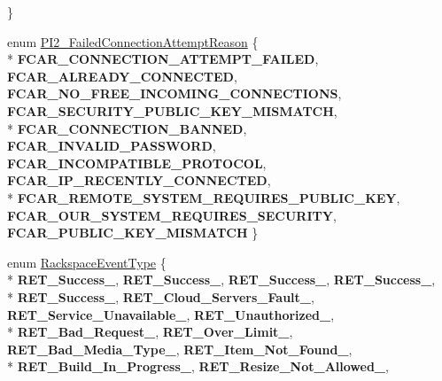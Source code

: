 \begin{DoxyCompactItemize}
 \}
\item 
enum \hyperlink{group___p_l_u_g_i_n___i_n_t_e_r_f_a_c_e___g_r_o_u_p_ga3e92f686bace869b78c10508c58e0825}{P\-I2\-\_\-\-Failed\-Connection\-Attempt\-Reason} \{ \\*
{\bfseries F\-C\-A\-R\-\_\-\-C\-O\-N\-N\-E\-C\-T\-I\-O\-N\-\_\-\-A\-T\-T\-E\-M\-P\-T\-\_\-\-F\-A\-I\-L\-E\-D}, 
{\bfseries F\-C\-A\-R\-\_\-\-A\-L\-R\-E\-A\-D\-Y\-\_\-\-C\-O\-N\-N\-E\-C\-T\-E\-D}, 
{\bfseries F\-C\-A\-R\-\_\-\-N\-O\-\_\-\-F\-R\-E\-E\-\_\-\-I\-N\-C\-O\-M\-I\-N\-G\-\_\-\-C\-O\-N\-N\-E\-C\-T\-I\-O\-N\-S}, 
{\bfseries F\-C\-A\-R\-\_\-\-S\-E\-C\-U\-R\-I\-T\-Y\-\_\-\-P\-U\-B\-L\-I\-C\-\_\-\-K\-E\-Y\-\_\-\-M\-I\-S\-M\-A\-T\-C\-H}, 
\\*
{\bfseries F\-C\-A\-R\-\_\-\-C\-O\-N\-N\-E\-C\-T\-I\-O\-N\-\_\-\-B\-A\-N\-N\-E\-D}, 
{\bfseries F\-C\-A\-R\-\_\-\-I\-N\-V\-A\-L\-I\-D\-\_\-\-P\-A\-S\-S\-W\-O\-R\-D}, 
{\bfseries F\-C\-A\-R\-\_\-\-I\-N\-C\-O\-M\-P\-A\-T\-I\-B\-L\-E\-\_\-\-P\-R\-O\-T\-O\-C\-O\-L}, 
{\bfseries F\-C\-A\-R\-\_\-\-I\-P\-\_\-\-R\-E\-C\-E\-N\-T\-L\-Y\-\_\-\-C\-O\-N\-N\-E\-C\-T\-E\-D}, 
\\*
{\bfseries F\-C\-A\-R\-\_\-\-R\-E\-M\-O\-T\-E\-\_\-\-S\-Y\-S\-T\-E\-M\-\_\-\-R\-E\-Q\-U\-I\-R\-E\-S\-\_\-\-P\-U\-B\-L\-I\-C\-\_\-\-K\-E\-Y}, 
{\bfseries F\-C\-A\-R\-\_\-\-O\-U\-R\-\_\-\-S\-Y\-S\-T\-E\-M\-\_\-\-R\-E\-Q\-U\-I\-R\-E\-S\-\_\-\-S\-E\-C\-U\-R\-I\-T\-Y}, 
{\bfseries F\-C\-A\-R\-\_\-\-P\-U\-B\-L\-I\-C\-\_\-\-K\-E\-Y\-\_\-\-M\-I\-S\-M\-A\-T\-C\-H}
 \}
\item 
enum \hyperlink{namespace_rak_net_a120cf6e1a0904cff45269f14c3c4c289}{Rackspace\-Event\-Type} \{ \\*
{\bfseries R\-E\-T\-\_\-\-Success\-\_}, 
{\bfseries R\-E\-T\-\_\-\-Success\-\_}, 
{\bfseries R\-E\-T\-\_\-\-Success\-\_}, 
{\bfseries R\-E\-T\-\_\-\-Success\-\_}, 
\\*
{\bfseries R\-E\-T\-\_\-\-Success\-\_}, 
{\bfseries R\-E\-T\-\_\-\-Cloud\-\_\-\-Servers\-\_\-\-Fault\-\_}, 
{\bfseries R\-E\-T\-\_\-\-Service\-\_\-\-Unavailable\-\_}, 
{\bfseries R\-E\-T\-\_\-\-Unauthorized\-\_}, 
\\*
{\bfseries R\-E\-T\-\_\-\-Bad\-\_\-\-Request\-\_}, 
{\bfseries R\-E\-T\-\_\-\-Over\-\_\-\-Limit\-\_}, 
{\bfseries R\-E\-T\-\_\-\-Bad\-\_\-\-Media\-\_\-\-Type\-\_}, 
{\bfseries R\-E\-T\-\_\-\-Item\-\_\-\-Not\-\_\-\-Found\-\_}, 
\\*
{\bfseries R\-E\-T\-\_\-\-Build\-\_\-\-In\-\_\-\-Progress\-\_}, 
{\bfseries R\-E\-T\-\_\-\-Resize\-\_\-\-Not\-\_\-\-Allowed\-\_}, 

\end{DoxyCompactItemize}
